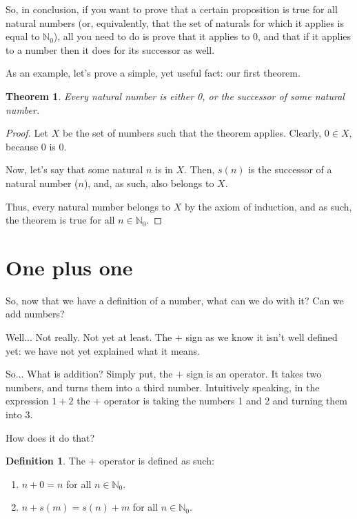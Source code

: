 \documentclass[12pt,a4paper]{article}
\theoremstyle{definition}
\newtheorem{definition}{Definition}
\theoremstyle{definition}
\theoremstyle{plain}
\newtheorem{theorem}{Theorem}
\theoremstyle{plain}
\newcommand{\N}{\mathbb{N}}
\begin{document}
	So, in conclusion, if you want to prove that a certain proposition is true for all natural numbers (or, equivalently, that the set of naturals for which it applies is equal to $\N_0$), all you need to do is prove that it applies to 0, and that if it applies to a number then it does for its successor as well.
	
	As an example, let's prove a simple, yet useful fact: our first theorem.
	
	\begin{theorem}
		Every natural number is either 0, or the successor of some natural number.
	\end{theorem}
	
	\begin{proof}
		Let $X$ be the set of numbers such that the theorem applies. Clearly, $0 \in X$, because 0 is 0.
		
		Now, let's say that some natural $n$ is in $X$. Then, $s(n)$ is the successor of a natural number ($n$), and, as such, also belongs to $X$.
		
		Thus, every natural number belongs to $X$ by the axiom of induction, and as such, the theorem is true for all $n \in \N_0$.
	\end{proof}
	
	\section{One plus one}
	
	So, now that we have a definition of a number, what can we do with it? Can we add numbers?
	
	Well... Not really. Not yet at least. The $+$ sign as we know it isn't well defined yet: we have not yet explained what it means.
	
	So... What is addition? Simply put, the $+$ sign is an operator. It takes two numbers, and turns them into a third number. Intuitively speaking, in the expression $1+2$ the $+$ operator is taking the numbers 1 and 2 and turning them into 3.
	
	How does it do that?
	
	\begin{definition}
		The $+$ operator is defined as such:
		
		\begin{enumerate}
			\item $n + 0 = n$ for all $n \in \N_0$.
			\item $n + s(m) = s(n) + m$ for all $n \in \N_0$.
		\end{enumerate}
	\end{definition}
	
\end{document}
